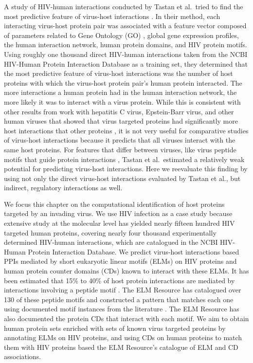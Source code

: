 A study of HIV-human interactions conducted by Tastan et al.\ tried to
find the most predictive feature of virus-host interactions
\cite{tastan09}. In their method, each interacting virus-host protein
pair was associated with a feature vector composed of parameters
related to Gene Ontology (GO) \cite{ashburner00}, global gene
expression profiles, the human interaction network, human protein
domains, and HIV protein motifs. Using roughly one thousand direct
HIV-human interactions taken from the NCBI HIV-Human Protein
Interaction Database \cite{fu09,ptak08} as a training set, they
determined that the most predictive feature of virus-host interactions
was the number of host proteins with which the virus-host protein
pair's human protein interacted. The more interactions a human protein
had in the human interaction network, the more likely it was to
interact with a virus protein. While this is consistent with other
results from work with hepatitis C virus, Epstein-Barr virus, and
other human viruses that showed that virus targeted proteins had
significantly more host interactions that other proteins
\cite{calderwood07,dyer08,dechassey08}, it is not very useful for
comparative studies of virus-host interactions because it predicts
that all viruses interact with the same host proteins. For features
that differ between viruses, like virus peptide motifs that guide
protein interactions \cite{tonikian08,shelton08,kadaveru08}, Tastan et
al.\ estimated a relatively weak potential for predicting virus-host
interactions. Here we reevaluate this finding by using not only the
direct virus-host interactions evaluated by Tastan et al., but
indirect, regulatory interactions as well.

We focus this chapter on the computational identification of host
proteins targeted by an invading virus. We use HIV infection as a case
study because extensive study at the molecular level has yielded
nearly fifteen hundred HIV targeted human proteins, covering nearly
four thousand experimentally determined HIV-human interactions, which
are catalogued in the NCBI HIV-Human Protein Interaction Database. We
predict virus-host interactions based PPIs mediated by short
eukaryotic linear motifs (ELMs) \cite{puntervoll03} on HIV proteins
and human protein counter domains (CDs) known to interact with these
ELMs. It has been estimated that 15\% to 40\% of host protein
interactions are mediated by interactions involving a peptide motif
\cite{ceol2006domino,neduva2006peptides,petsalaki2008peptide}. The ELM
Resource has catalogued over 130 of these peptide motifs and
constructed a pattern that matches each one using documented motif
instances from the literature \cite{puntervoll03}. The ELM Resource
has also documented the protein CDs that interact with each motif. We
aim to obtain human protein sets enriched with sets of known virus
targeted proteins by annotating ELMs on HIV proteins, and using CDs on
human proteins to match them with HIV proteins based the ELM
Resource's catalogue of ELM and CD associations.

